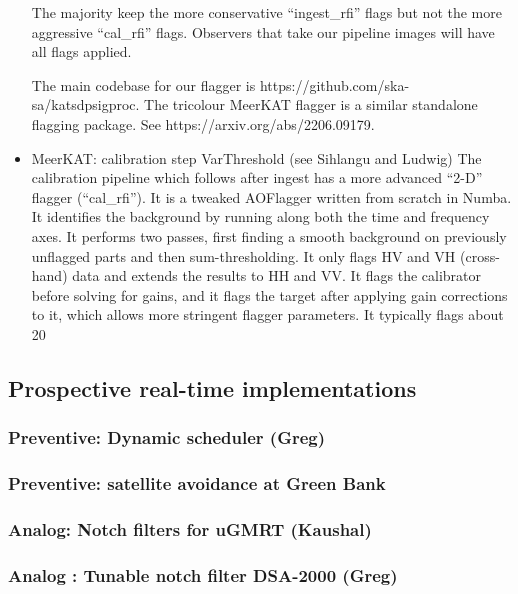 \begin{itemize}
The majority keep the more conservative “ingest\_rfi” flags but not the more aggressive “cal\_rfi” flags. Observers that take our pipeline images will have all flags applied.

The main codebase for our flagger is https://github.com/ska-sa/katsdpsigproc. The tricolour MeerKAT flagger is a similar standalone flagging package. See https://arxiv.org/abs/2206.09179.


\item MeerKAT: calibration step VarThreshold  (see Sihlangu and Ludwig)
The calibration pipeline which follows after ingest has a more advanced “2-D” flagger (“cal\_rfi”). It is a tweaked AOFlagger written from scratch in Numba. It identifies the background by running along both the time and frequency axes. It performs two passes, first finding a smooth background on previously unflagged parts and then sum-thresholding. It only flags HV and VH (cross-hand) data and extends the results to HH and VV. It flags the calibrator before solving for gains, and it flags the target after applying gain corrections to it, which allows more stringent flagger parameters. It typically flags about 20%


\end{itemize}

\subsection{Prospective real-time implementations}
\label{subsection:hardware:catalog:prospective}

\subsubsection{Preventive: Dynamic scheduler (Greg)}
\subsubsection{Preventive: satellite avoidance at Green Bank}
\subsubsection{Analog: Notch filters for uGMRT (Kaushal)}
\subsubsection{Analog : Tunable notch filter DSA-2000 (Greg)}

